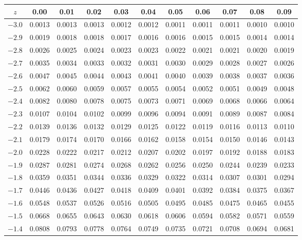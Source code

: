 \documentclass[lang=cn,10pt]{elegantbook}
\begin{document}
\begin{longtable}{c|cccccccccc}
    \hline
    $z$ & 0.00 & 0.01 & 0.02 & 0.03 & 0.04 & 0.05 & 0.06 & 0.07 & 0.08 & 0.09 \\
    \hline
    \endhead
    $-3.0$ & 0.0013 & 0.0013 & 0.0013 & 0.0012 & 0.0012 & 0.0011 & 0.0011 & 0.0011 & 0.0010 & 0.0010 \\
    $-2.9$ & 0.0019 & 0.0018 & 0.0018 & 0.0017 & 0.0016 & 0.0016 & 0.0015 & 0.0015 & 0.0014 & 0.0014 \\
    $-2.8$ & 0.0026 & 0.0025 & 0.0024 & 0.0023 & 0.0023 & 0.0022 & 0.0021 & 0.0021 & 0.0020 & 0.0019 \\
    $-2.7$ & 0.0035 & 0.0034 & 0.0033 & 0.0032 & 0.0031 & 0.0030 & 0.0029 & 0.0028 & 0.0027 & 0.0026 \\
    $-2.6$ & 0.0047 & 0.0045 & 0.0044 & 0.0043 & 0.0041 & 0.0040 & 0.0039 & 0.0038 & 0.0037 & 0.0036 \\
    $-2.5$ & 0.0062 & 0.0060 & 0.0059 & 0.0057 & 0.0055 & 0.0054 & 0.0052 & 0.0051 & 0.0049 & 0.0048 \\
    $-2.4$ & 0.0082 & 0.0080 & 0.0078 & 0.0075 & 0.0073 & 0.0071 & 0.0069 & 0.0068 & 0.0066 & 0.0064 \\
    $-2.3$ & 0.0107 & 0.0104 & 0.0102 & 0.0099 & 0.0096 & 0.0094 & 0.0091 & 0.0089 & 0.0087 & 0.0084 \\
    $-2.2$ & 0.0139 & 0.0136 & 0.0132 & 0.0129 & 0.0125 & 0.0122 & 0.0119 & 0.0116 & 0.0113 & 0.0110 \\
    $-2.1$ & 0.0179 & 0.0174 & 0.0170 & 0.0166 & 0.0162 & 0.0158 & 0.0154 & 0.0150 & 0.0146 & 0.0143 \\
    $-2.0$ & 0.0228 & 0.0222 & 0.0217 & 0.0212 & 0.0207 & 0.0202 & 0.0197 & 0.0192 & 0.0188 & 0.0183 \\
    $-1.9$ & 0.0287 & 0.0281 & 0.0274 & 0.0268 & 0.0262 & 0.0256 & 0.0250 & 0.0244 & 0.0239 & 0.0233 \\
    $-1.8$ & 0.0359 & 0.0351 & 0.0344 & 0.0336 & 0.0329 & 0.0322 & 0.0314 & 0.0307 & 0.0301 & 0.0294 \\
    $-1.7$ & 0.0446 & 0.0436 & 0.0427 & 0.0418 & 0.0409 & 0.0401 & 0.0392 & 0.0384 & 0.0375 & 0.0367 \\
    $-1.6$ & 0.0548 & 0.0537 & 0.0526 & 0.0516 & 0.0505 & 0.0495 & 0.0485 & 0.0475 & 0.0465 & 0.0455 \\
    $-1.5$ & 0.0668 & 0.0655 & 0.0643 & 0.0630 & 0.0618 & 0.0606 & 0.0594 & 0.0582 & 0.0571 & 0.0559 \\
    $-1.4$ & 0.0808 & 0.0793 & 0.0778 & 0.0764 & 0.0749 & 0.0735 & 0.0721 & 0.0708 & 0.0694 & 0.0681 \\

\end{longtable}
\end{document}
